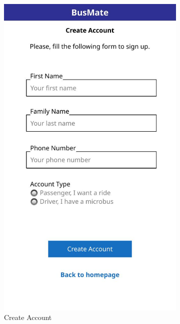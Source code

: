 \documentclass{BusMateSRS}
\begin{document}
\begin{figure}[h!]
\begin{subfigure}[b]{0.3\textwidth}
		\includegraphics[width=\textwidth]{images-ui/ui-out-2.jpg}
		\caption{Create Account}
		\label{fig:ui2}
	\end{subfigure}
	\hfill
	\begin{subfigure}[b]{0.3\textwidth}
		\centering

\end{subfigure}
\end{figure}
\end{document}
